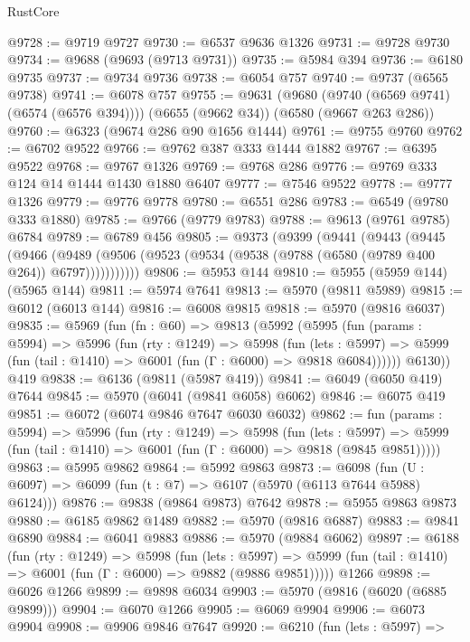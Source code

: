 \begin{lexlean}{RustCore}
\begin{coremodule}
{\begin{coremodule}
{{{{{{{{{{{{{{{{{{{{{{{{{{{{{{{{{{{{{{{{{{{{{@9728 := @9719 @9727
@9730 := @6537 @9636 @1326
@9731 := @9728 @9730
@9734 := @9688 (@9693 (@9713 @9731))
@9735 := @5984 @394
@9736 := @6180 @9735
@9737 := @9734 @9736
@9738 := @6054 @757
@9740 := @9737 (@6565 @9738)
@9741 := @6078 @757
@9755 := @9631
    (@9680 (@9740 (@6569 @9741) (@6574 (@6576 @394))))
    (@6655 (@9662 @34))
    (@6580 (@9667 @263 @286))
@9760 := @6323 (@9674 @286 @90 @1656 @1444)
@9761 := @9755 @9760
@9762 := @6702 @9522
@9766 := @9762 @387 @333 @1444 @1882
@9767 := @6395 @9522
@9768 := @9767 @1326
@9769 := @9768 @286
@9776 := @9769 @333 @124 @14 @1444 @1430 @1880 @6407
@9777 := @7546 @9522
@9778 := @9777 @1326
@9779 := @9776 @9778
@9780 := @6551 @286
@9783 := @6549 (@9780 @333 @1880)
@9785 := @9766 (@9779 @9783)
@9788 := @9613 (@9761 @9785) @6784
@9789 := @6789 @456
@9805 := @9373
    (@9399
      (@9441
        (@9443
          (@9445
            (@9466
              (@9489 (@9506 (@9523 (@9534 (@9538 (@9788 (@6580 (@9789 @400 @264)) @6797)))))))))))
@9806 := @5953 @144
@9810 := @5955 (@5959 @144) (@5965 @144)
@9811 := @5974 @7641
@9813 := @5970 (@9811 @5989)
@9815 := @6012 (@6013 @144)
@9816 := @6008 @9815
@9818 := @5970 (@9816 @6037)
@9835 := @5969
    (fun (fn : @60) =>
    @9813
      (@5992
        (@5995
          (fun (params : @5994) =>
          @5996
            (fun (rty : @1249) =>
            @5998
              (fun (lets : @5997) =>
              @5999 (fun (tail : @1410) => @6001 (fun (Γ : @6000) => @9818 @6084))))))
        @6130))
    @419
@9838 := @6136 (@9811 (@5987 @419))
@9841 := @6049 (@6050 @419) @7644
@9845 := @5970 (@6041 (@9841 @6058) @6062)
@9846 := @6075 @419
@9851 := @6072 (@6074 @9846 @7647 @6030 @6032)
@9862 := fun (params : @5994) =>
  @5996
    (fun (rty : @1249) =>
    @5998
      (fun (lets : @5997) =>
      @5999 (fun (tail : @1410) => @6001 (fun (Γ : @6000) => @9818 (@9845 @9851)))))
@9863 := @5995 @9862
@9864 := @5992 @9863
@9873 := @6098 (fun (U : @6097) => @6099 (fun (t : @7) => @6107 (@5970 (@6113 @7644 @5988) @6124)))
@9876 := @9838 (@9864 @9873) @7642
@9878 := @5955 @9863 @9873
@9880 := @6185 @9862 @1489
@9882 := @5970 (@9816 @6887)
@9883 := @9841 @6890
@9884 := @6041 @9883
@9886 := @5970 (@9884 @6062)
@9897 := @6188
    (fun (rty : @1249) =>
    @5998
      (fun (lets : @5997) =>
      @5999 (fun (tail : @1410) => @6001 (fun (Γ : @6000) => @9882 (@9886 @9851)))))
    @1266
@9898 := @6026 @1266
@9899 := @9898 @6034
@9903 := @5970 (@9816 (@6020 (@6885 @9899)))
@9904 := @6070 @1266
@9905 := @6069 @9904
@9906 := @6073 @9904
@9908 := @9906 @9846 @7647
@9920 := @6210
    (fun (lets : @5997) =>
}}}}}}}}}}}}}}}}}}}}}}}}}}}}}}}}}}}}}}}}}}}}}
\end{coremodule}}
\end{coremodule}
\end{lexlean}
